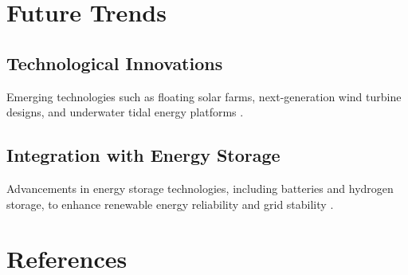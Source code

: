\documentclass[12pt]{article}
\begin{document}
\section{Future Trends}
\subsection{Technological Innovations}
Emerging technologies such as floating solar farms, next-generation wind turbine designs, and underwater tidal energy platforms \citep{chabot2018floating, musslewhite2016underwater}.

\subsection{Integration with Energy Storage}
Advancements in energy storage technologies, including batteries and hydrogen storage, to enhance renewable energy reliability and grid stability \citep{noel2018overview, zakeri2015review}.

\section*{References}


\end{document}
